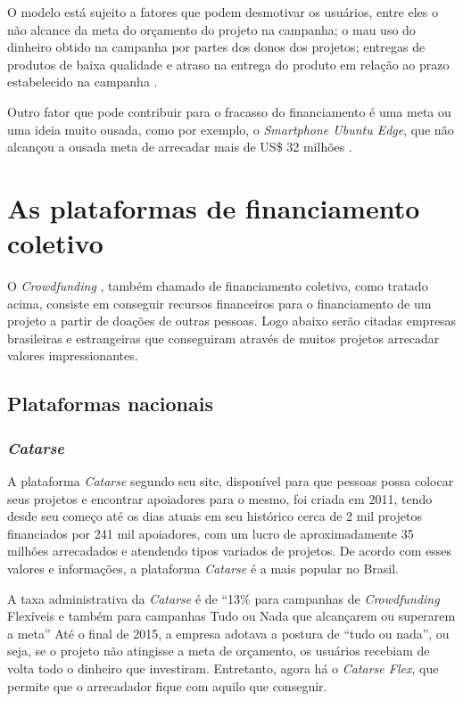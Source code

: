 \documentclass{classe_cn}                 %
\begin{document}
O modelo está sujeito a fatores que podem desmotivar os usuários, entre eles o não alcance da meta do orçamento do projeto na campanha; o mau uso do dinheiro obtido na campanha por partes dos donos dos projetos; entregas de produtos de baixa qualidade e atraso na entrega do produto em relação ao prazo estabelecido na campanha \cite{PEREIRA:2016}.

Outro fator que pode contribuir para o fracasso do financiamento é uma meta ou uma ideia muito ousada, como por exemplo, o \textit{Smartphone Ubuntu Edge}, que não alcançou a ousada meta de arrecadar mais de US\$ 32 milhões \cite{GAZETA:2017}.

\section{As plataformas de financiamento coletivo}

O \textit{Crowdfunding} , também chamado de financiamento coletivo, como tratado acima, consiste em conseguir recursos financeiros para o financiamento de um projeto a partir de doações de outras pessoas. Logo abaixo serão citadas empresas brasileiras e estrangeiras que conseguiram através de muitos projetos arrecadar valores impressionantes. 

\subsection{Plataformas nacionais}

\subsubsection{\textit{Catarse}}

A plataforma \textit{Catarse} segundo seu site, disponível para que pessoas possa colocar seus projetos e encontrar apoiadores para o mesmo, foi criada em 2011, tendo desde seu começo até os dias atuais em seu histórico cerca de 2 mil projetos financiados por 241 mil apoiadores, com um lucro de aproximadamente 35 milhões arrecadados e atendendo tipos variados de projetos. De acordo com esses valores e informações, a plataforma \textit{Catarse} é a mais popular no Brasil.

A taxa administrativa da \textit{Catarse} é de “13\% para campanhas de \textit{Crowdfunding}  Flexíveis e também para campanhas Tudo ou Nada que alcançarem ou superarem a meta” \cite{BRASIL:2017} Até o final de 2015, a empresa adotava a postura de “tudo ou nada”, ou seja, se o projeto não atingisse a meta de orçamento, os usuários recebiam de volta todo o dinheiro que investiram. Entretanto, agora há o \textit{Catarse Flex}, que permite que o arrecadador fique com aquilo que conseguir.
\end{document}
